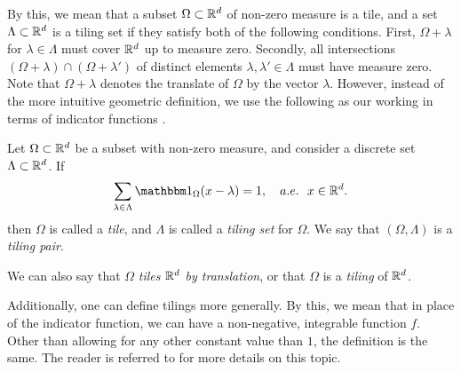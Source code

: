 \documentclass[../thesis.tex]{subfiles}
\begin{document}
By this, we mean that a subset $\Omega \subset \mathbb{R}^d$ of non-zero measure is a tile, and a set $\Lambda \subset \mathbb{R}^d$ is a tiling set if they satisfy both of the following conditions. First, $\Omega+\lambda$ for $\lambda \in \Lambda$ must cover $\mathbb{R}^d$ up to measure zero. Secondly, all intersections $(\Omega+\lambda) \cap (\Omega+\lambda')$ of distinct elements $\lambda,\lambda' \in \Lambda$ must have measure zero. Note that $\Omega+\lambda$ denotes the translate of $\Omega$ by the vector $\lambda$. However, instead of the more intuitive geometric definition, we use the following as our working  in terms of indicator functions \cite{kolountzakisTilingsTranslation2010,kolountzakisStructureTilingsLine1996}.  %
\begin{definition}\label{def:tiling}
    Let $\Omega \subset \mathbb{R}^d$ be a subset with non-zero measure, and consider a discrete set $\Lambda \subset \mathbb{R}^d$. If
    \begin{equation}\label{eq:tiling_set}
        \sum_{\lambda \in \Lambda} \indicator{\Omega}{x-\lambda} = 1, \quad a.e. \text{\space\space} x \in \R^d.
    \end{equation}
    then $\Omega$ is called a \emph{tile}, and $\Lambda$ is called a \emph{tiling set} for $\Omega$. We say that $(\Omega, \Lambda)$ is a \emph{tiling pair}.
\end{definition}
\begin{remark}
    We can also say that $\Omega$ \emph{tiles $\mathbb{R}^d$ by translation}, or that $\Omega$ is a \emph{tiling} of $\mathbb{R}^d$. 
\end{remark}
\begin{remark}
    Additionally, one can define tilings more generally. By this, we mean that in place of the indicator function, we can have a non-negative, integrable function $f$. Other than allowing for any other constant value than $1$, the definition is the same. The reader is referred to \cite{kolountzakisTilingsTranslation2010,kolountzakisStructureTilingsLine1996} for more details on this topic.
\end{remark}
\end{document}
